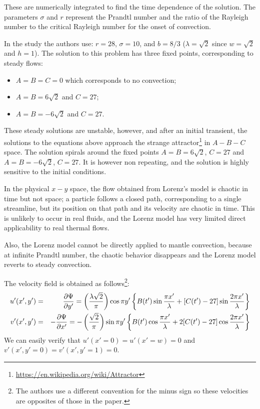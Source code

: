 These are numerically integrated to find the time dependence of the solution. 
The parameters $\sigma$ and $r$ represent the Prandtl number  and the ratio
of the Rayleigh number to the critical Rayleigh number for the onset of convection.

In the study the authors use: $r=28$, $\sigma=10$, and $b=8/3$ ($\lambda=\sqrt 2$ since
$w=\sqrt{2}$ and $h=1$).
The solution to this problem has three fixed points, corresponding to
steady flows:

\begin{itemize}
\item $A=B=C=0$ which corresponds to no convection;
\item $A=B=6\sqrt 2$ and $C=27$;
\item $A=B=-6\sqrt 2$ and $C=27$.
\end{itemize}
These steady solutions are unstable, however, and after an initial transient, the solutions 
to the equations above approach the strange 
attractor\footnote{\url{https://en.wikipedia.org/wiki/Attractor}} in $A-B-C$ space.
The solution spirals around the fixed points $A=B=6\sqrt 2$, $C=27$ and 
$A=B=-6\sqrt 2$, $C=27$. It is however non repeating, and the solution is highly sensitive to the initial 
conditions. 

In the physical $x-y$ space, the flow obtained from Lorenz's
model is chaotic in time but not space; a particle follows
a closed path, corresponding to a single streamline, but
its position on that path and its velocity are chaotic in time.
This is unlikely to occur in real fluids, and the Lorenz model 
has very limited direct applicability to real thermal flows.

Also, the Lorenz model cannot be directly applied to mantle convection, 
because at infinite Prandtl number, the chaotic behavior disappears and the Lorenz 
model reverts to steady convection.

The velocity field is obtained as follows\footnote{The authors use a different 
convention for the minus sign so these velocities are opposites of those in the paper.}:
\begin{eqnarray}
u'(x',y') 
&=& \frac{\partial \Psi}{\partial y'} 
= \left(
\frac{\lambda \sqrt 2}{\pi}
\right)
\cos \pi y'
\left\{
B(t') \sin \frac{\pi x'}{\lambda}
+[C(t')-27]\sin \frac{2 \pi x'}{\lambda}
\right\} \nonumber\\
v'(x',y') 
&=& -\frac{\partial \Psi}{\partial x'} 
=-
\left(
\frac{ \sqrt 2}{\pi}
\right)
\sin \pi y'
\left\{
B(t') \cos \frac{\pi x'}{\lambda}
+2[C(t')-27]\cos \frac{2 \pi x'}{\lambda}
\right\}
\end{eqnarray}
We can easily verify that $u'(x'=0)=u'(x'=w)=0$ and
$v'(x',y'=0)=v'(x',y'=1)=0$.

